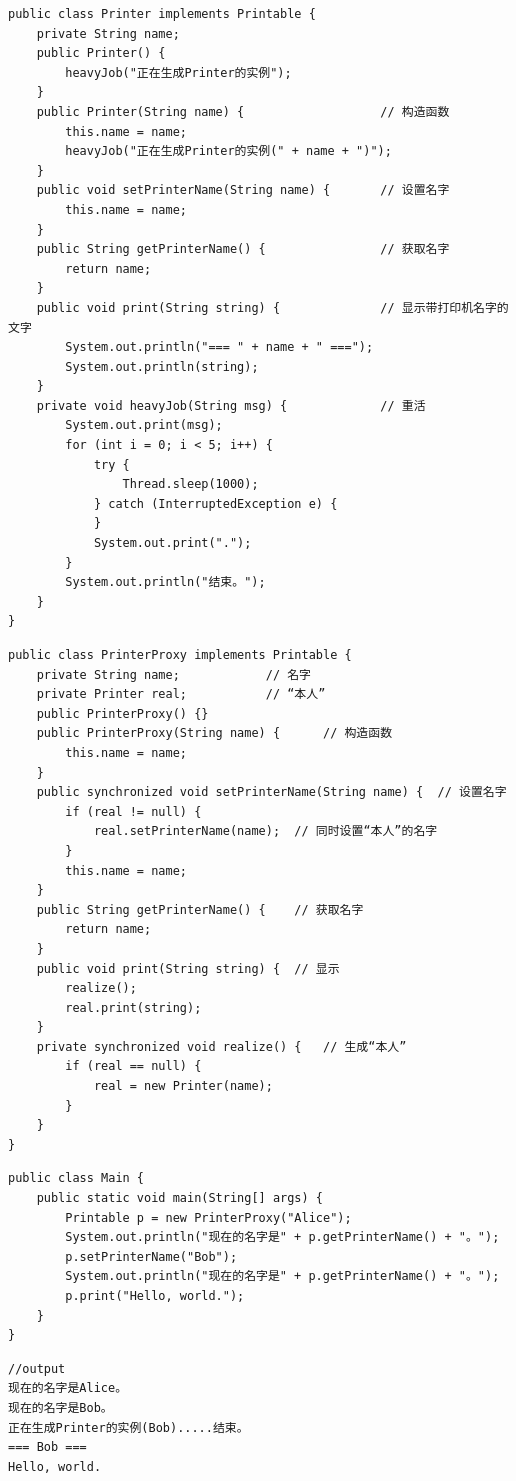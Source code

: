 \begin{lstlisting}
public class Printer implements Printable {
	private String name;
	public Printer() {
		heavyJob("正在生成Printer的实例");
	}
	public Printer(String name) {                   // 构造函数
		this.name = name;
		heavyJob("正在生成Printer的实例(" + name + ")");
	}
	public void setPrinterName(String name) {       // 设置名字
		this.name = name;
	}
	public String getPrinterName() {                // 获取名字
		return name;
	}
	public void print(String string) {              // 显示带打印机名字的文字
		System.out.println("=== " + name + " ===");
		System.out.println(string);
	}
	private void heavyJob(String msg) {             // 重活
		System.out.print(msg);
		for (int i = 0; i < 5; i++) {
			try {
				Thread.sleep(1000);
			} catch (InterruptedException e) {
			}
			System.out.print(".");
		}
		System.out.println("结束。");
	}
}
\end{lstlisting}
\begin{lstlisting}
public class PrinterProxy implements Printable {
	private String name;            // 名字
	private Printer real;           // “本人”
	public PrinterProxy() {}
	public PrinterProxy(String name) {      // 构造函数
		this.name = name;
	}
	public synchronized void setPrinterName(String name) {  // 设置名字
		if (real != null) {
			real.setPrinterName(name);  // 同时设置“本人”的名字
		}
		this.name = name;
	}
	public String getPrinterName() {    // 获取名字
		return name;
	}
	public void print(String string) {  // 显示
		realize();
		real.print(string);
	}
	private synchronized void realize() {   // 生成“本人”
		if (real == null) {
			real = new Printer(name);
		}
	}
}
\end{lstlisting}
\begin{lstlisting}
public class Main {
	public static void main(String[] args) {
		Printable p = new PrinterProxy("Alice");
		System.out.println("现在的名字是" + p.getPrinterName() + "。");
		p.setPrinterName("Bob");
		System.out.println("现在的名字是" + p.getPrinterName() + "。");
		p.print("Hello, world.");
	}
}
\end{lstlisting}
\begin{lstlisting}
//output
现在的名字是Alice。
现在的名字是Bob。
正在生成Printer的实例(Bob).....结束。
=== Bob ===
Hello, world.
\end{lstlisting}
